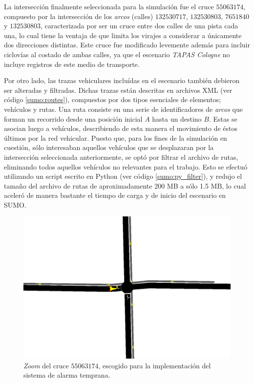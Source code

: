 \documentclass[11pt,letterpaper]{article}
\begin{document}
La intersección finalmente seleccionada para la simulación fue el cruce $55063174$, compuesto por la intersección de los \emph{arcos} (calles) $132530717$, $132530803$, $7651840$ y $132530803$, caracterizada por ser un cruce entre dos calles de una pista cada una, lo cual tiene la ventaja de que limita los virajes a considerar a únicamente dos direcciones distintas. Este cruce fue modificado levemente además para incluir ciclovías al costado de ambas calles, ya que el escenario \emph{TAPAS Cologne} no incluye registros de este medio de transporte.

Por otro lado, las trazas vehiculares incluídas en el escenario también debieron ser alteradas y filtradas. Dichas trazas están descritas en archivos XML (ver código \ref{sumo:routes}), compuestos por dos tipos esenciales de elementos; vehículos y rutas. Una ruta consiste en una serie de identificadores de \emph{arcos} que forman un recorrido desde una posición inicial $A$ hasta un destino $B$. Estas se asocian luego a vehículos, describiendo de esta manera el movimiento de éstos últimos por la red vehicular. Puesto que, para los fines de la simulación en cuestión, sólo interesaban aquellos vehículos que se desplazaran por la intersección seleccionada anteriormente, se optó por filtrar el archivo de rutas, eliminando todos aquellos vehículos no relevantes para el trabajo. Esto se efectuó utilizando un script escrito en Python (ver código \ref{sumo:py_filter}), y redujo el tamaño del archivo de rutas de aproximadamente 200 MB a sólo 1.5 MB, lo cual aceleró de manera bastante el tiempo de carga y de inicio del escenario en SUMO.

\begin{figure}
	\centering
	\includegraphics[width=\linewidth]{junction.png}
	\caption[Cruce $55063174$]{\emph{Zoom} del cruce $55063174$, escogido para la implementación del sistema de alarma temprana.}
	\label{sumo:junction}
\end{figure}
\end{document}
